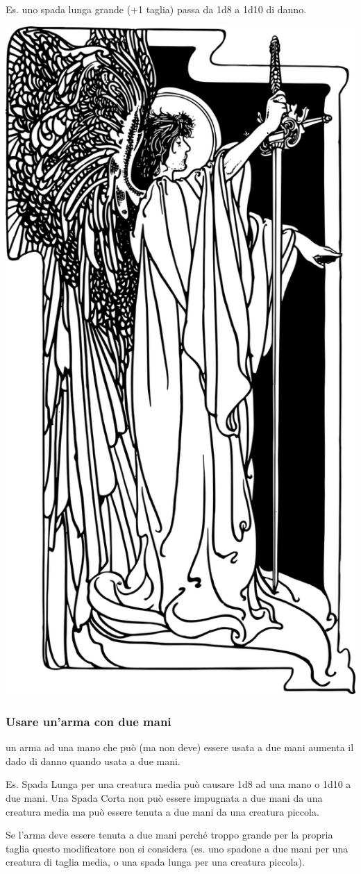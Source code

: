 \begin{multicols}{2}
Es. uno spada lunga grande (+1 taglia) passa da 1d8 a 1d10 di danno.

\medskip

\begin{center}
	\includegraphics[width=0.55\linewidth]{immagini/angelospadone.png}
\end{center}

\subsubsection{Usare un'arma con due mani} \label{usarearmaconduemani}

un arma ad una mano che può (ma non deve) essere usata a due mani aumenta il dado di danno quando usata a due mani.

Es. Spada Lunga per una creatura media può causare 1d8 ad una mano o 1d10 a due mani. Una Spada Corta non può essere impugnata a due mani da una creatura media ma può essere tenuta a due mani da una creatura piccola.

Se l'arma deve essere tenuta a due mani perché troppo grande per la propria taglia questo modificatore non si considera (es. uno spadone a due mani per una creatura di taglia media, o una spada lunga per una creatura piccola).


\end{multicols}
